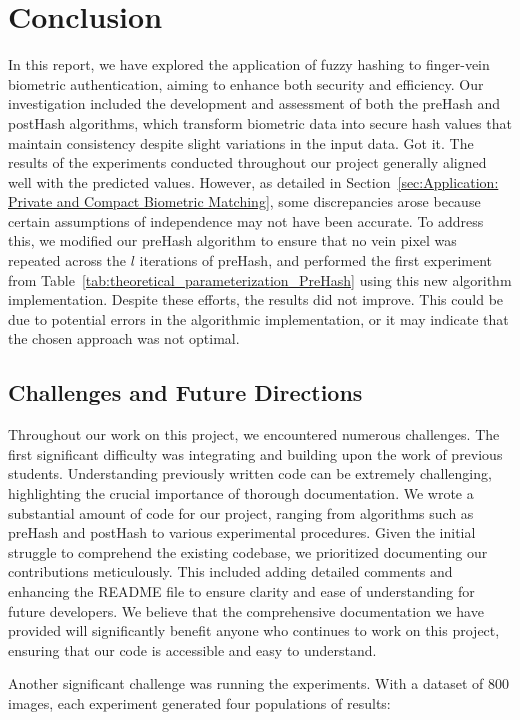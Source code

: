 \newpage

\section{Conclusion}
In this report, we have explored the application of fuzzy hashing to finger-vein biometric authentication, aiming to enhance both security and efficiency. Our investigation included the development and assessment of both the preHash and postHash algorithms, which transform biometric data into secure hash values that maintain consistency despite slight variations in the input data. Got it. The results of the experiments conducted throughout our project generally aligned well with the predicted values. However, as detailed in Section~\ref{sec:Application: Private and Compact Biometric Matching}, some discrepancies arose because certain assumptions of independence may not have been accurate. To address this, we modified our preHash algorithm to ensure that no vein pixel was repeated across the \(l\) iterations of preHash, and performed the first experiment from Table~\ref{tab:theoretical_parameterization_PreHash} using this new algorithm implementation. Despite these efforts, the results did not improve. This could be due to potential errors in the algorithmic implementation, or it may indicate that the chosen approach was not optimal.


\subsection{Challenges and Future Directions}
Throughout our work on this project, we encountered numerous challenges. The first significant difficulty was integrating and building upon the work of previous students. Understanding previously written code can be extremely challenging, highlighting the crucial importance of thorough documentation. We wrote a substantial amount of code for our project, ranging from algorithms such as preHash and postHash to various experimental procedures. Given the initial struggle to comprehend the existing codebase, we prioritized documenting our contributions meticulously. This included adding detailed comments and enhancing the README file to ensure clarity and ease of understanding for future developers. We believe that the comprehensive documentation we have provided will significantly benefit anyone who continues to work on this project, ensuring that our code is accessible and easy to understand.

Another significant challenge was running the experiments. With a dataset of 800 images, each experiment generated four populations of results:

